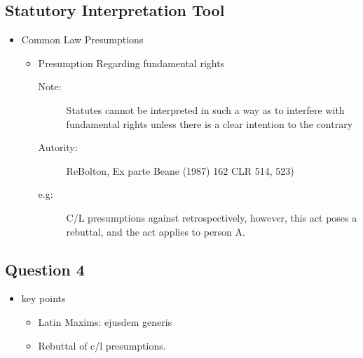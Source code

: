 \subsection*{Statutory Interpretation Tool}
\begin{itemize}
    \item Common Law Presumptions
        \begin{itemize}
            \item Presumption Regarding fundamental rights
                \begin{description}
                    \item[Note:] Statutes cannot be interpreted in such a way as to interfere with fundamental rights unless there is a clear intention to the contrary
                    \item[Autority:] ReBolton, Ex parte Beane (1987) 162 CLR 514, 523) 
                    \item[e.g:] C/L presumptions against retrospectively, however, this act poses a rebuttal, and the act applies to person A. 
                \end{description}
        \end{itemize}
\end{itemize}

\subsection*{Question 4}
\begin{itemize}
    \item key points
        \begin{itemize}
            \item Latin Maxims: ejusdem generis
            \item Rebuttal of c/l presumptions.
        \end{itemize}
\end{itemize}
